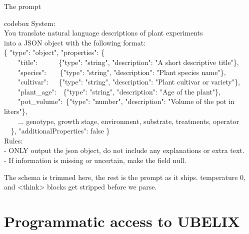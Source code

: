 \documentclass[aspectratio=169,11pt]{beamer}
\newenvironment{codebox}
  {\begin{beamercolorbox}[wd=\dimexpr\textwidth-16pt\relax,sep=7pt]{codebox}\ttfamily\footnotesize}
  {\end{beamercolorbox}}
\newcommand{\key}[1]{{\color{ubBlue}\ttfamily #1}}
\begin{document}
\begin{frame}{The prompt}
  \begin{codebox}
    \scriptsize
    System:\\
    You translate natural language descriptions of plant experiments\\
    into a JSON object with the following format:\\
    \color{ubMuted}\{ "type": "object", "properties": \{\\
    ~~~~"title":~~~~~~\{"type": "string", "description": "A short descriptive title"\},\\
    ~~~~"species":~~~~\{"type": "string", "description": "Plant species name"\},\\
    ~~~~"cultivar":~~~\{"type": "string", "description": "Plant cultivar or variety"\},\\
    ~~~~"plant\_age":~~\{"type": "string", "description": "Age of the plant"\},\\
    ~~~~"pot\_volume":~\{"type": "number", "description": "Volume of the pot in liters"\},\\
    ~~~~... genotype, growth stage, environment, substrate, treatments, operator\\
    ~~\}, "additionalProperties": false \}\color{ubText}\\[0.15em]
    Rules:\\
    - ONLY output the json object, do not include any explanations or extra text.\\
    - If information is missing or uncertain, make the field null.
  \end{codebox}
  \vspace{0.1em}
  {\small\color{ubMuted}The schema is trimmed here, the rest is the prompt as it
  ships. \key{temperature 0}, and \key{<think>} blocks get stripped before we parse.}
\end{frame}

\section{Programmatic access to UBELIX}
\end{document}
